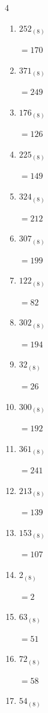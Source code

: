 \begin{multicols}{4}
\begin{enumerate}
  \item $252_{(8)}$

        $=170$

  \item $371_{(8)}$

        $=249$

  \item $176_{(8)}$

        $=126$

  \item $225_{(8)}$

        $=149$

  \item $324_{(8)}$

        $=212$

  \item $307_{(8)}$

        $=199$

  \item $122_{(8)}$

        $=82$

  \item $302_{(8)}$

        $=194$

  \item $32_{(8)}$

        $=26$

  \item $300_{(8)}$

        $=192$

  \item $361_{(8)}$

        $=241$

  \item $213_{(8)}$

        $=139$

  \item $153_{(8)}$

        $=107$

  \item $2_{(8)}$

        $=2$

  \item $63_{(8)}$

        $=51$

\columnbreak %

  \item $72_{(8)}$

        $=58$

  \item $54_{(8)}$


\end{enumerate}
\end{multicols}
